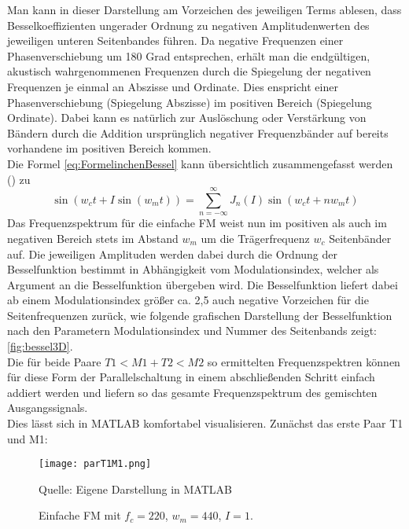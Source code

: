 Man kann in dieser Darstellung am Vorzeichen des jeweiligen Terms ablesen, dass Besselkoeffizienten ungerader Ordnung zu negativen Amplitudenwerten des jeweiligen unteren Seitenbandes führen. Da negative Frequenzen einer Phasenverschiebung um 180 Grad entsprechen, erhält man die endgültigen, akustisch wahrgenommenen Frequenzen durch die Spiegelung der negativen Frequenzen je einmal an Abszisse und Ordinate. Dies enspricht einer Phasenverschiebung (Spiegelung Abszisse) im positiven Bereich (Spiegelung Ordinate). Dabei kann es natürlich zur Auslöschung oder Verstärkung von Bändern durch die Addition ursprünglich negativer Frequenzbänder auf bereits vorhandene im positiven Bereich kommen. \\
Die Formel \ref{eq:FormelinchenBessel} kann übersichtlich zusammengefasst werden (\cite{schottstaedtWeb}) zu 
\begin{equation}\label{esq:Besselbabymonster}
\sin(w_ct + I\sin(w_mt)) = \sum_{n=-\infty}^{\infty}J_n(I)\sin(w_ct+nw_mt)
\end{equation}
Das Frequenzspektrum für die einfache FM weist nun im positiven als auch im negativen Bereich stets im Abstand \begin{math} w_m \end{math} um die Trägerfrequenz \begin{math} w_c \end{math} Seitenbänder auf. Die jeweiligen Amplituden werden dabei durch die Ordnung der Besselfunktion bestimmt in Abhängigkeit vom Modulationsindex, welcher als Argument an die Besselfunktion übergeben wird. Die Besselfunktion liefert dabei ab einem Modulationsindex größer ca. 2,5 auch negative Vorzeichen für die Seitenfrequenzen zurück, wie folgende grafischen Darstellung der Besselfunktion nach den Parametern Modulationsindex und Nummer des Seitenbands zeigt: \ref{fig:bessel3D}. \\
Die für beide Paare $T1<M1 + T2<M2$ so ermittelten Frequenzspektren können für diese Form der Parallelschaltung in einem abschließenden Schritt einfach addiert werden und liefern so das gesamte Frequenzspektrum des gemischten Ausgangssignals. \\
Dies lässt sich in MATLAB komfortabel visualisieren. Zunächst das erste Paar T1 und M1:
\FloatBarrier
\begin{figure} [ht]
\centering
  \texttt{[image: parT1M1.png]}
\caption{Einfache FM mit $f_c = 220$, $w_m = 440$, $I = 1$. }
Quelle: Eigene Darstellung in MATLAB
\end{figure}
\FloatBarrier
